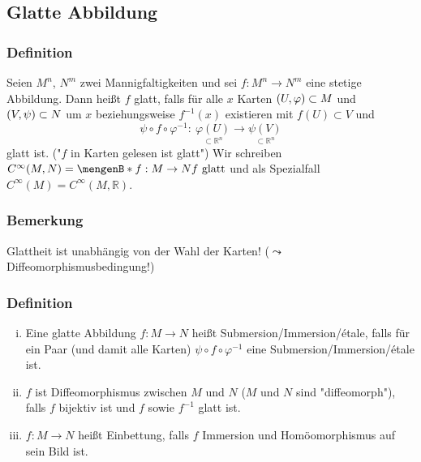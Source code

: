 
\subsection{Glatte Abbildung}
\label{sub:13}

\subsubsection[Definition: Glatte Funktionen zwischen zwei Mannigfaltigkeiten]{Definition}
\label{ssub:131}

Seien $M^n$, $N^m$ zwei Mannigfaltigkeiten und sei $f:M^n\to N^m$ eine stetige Abbildung. Dann heißt $f$ glatt, falls für alle $x$ Karten $(U,\varphi) \subset M$ und $(V,\psi) \subset N$ um $x$ beziehungsweise $f^{-1}(x)$ existieren mit $f(U)\subset V$ und 
\[
	\psi \circ f \circ \varphi^{-1}:\ \underset{\subset \mathds{R}^n}{\varphi(U)} \to \underset{\subset \mathds{R}^n}{\psi(V)}
\]
glatt ist. ("$f$ in Karten gelesen ist glatt")
Wir schreiben $C^{\infty}(M,N) = \set[f:M\to N]{f\ \text{glatt}}$ und als Spezialfall $C^{\infty}(M) = C^{\infty}(M,\mathds{R})$.

\subsubsection{Bemerkung}
\label{ssub:132}
Glattheit ist unabhängig von der Wahl der Karten! ($\leadsto$ Diffeomorphismusbedingung!)

\subsubsection{Definition}
\label{ssub:133}
\begin{enumerate}[(i)]
\item Eine glatte Abbildung $f:M\to N$ heißt Submersion/Immersion/étale, falls für ein Paar (und damit alle Karten) $\psi \circ f \circ \varphi^{-1}$ eine Submersion/Immersion/étale ist.
\item $f$ ist Diffeomorphismus zwischen $M$ und $N$ ($M$ und $N$ sind "diffeomorph"), falls $f$ bijektiv ist und $f$ sowie $f^{-1}$ glatt ist.
\item $f:M\to N$ heißt Einbettung, falls $f$ Immersion und Homöomorphismus auf sein Bild ist.
\end{enumerate}

